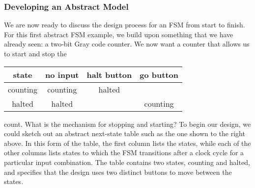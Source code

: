 \subsubsection{Developing an Abstract Model}

\begin{minipage}{3.25in}
We are now ready to discuss the design process for an FSM from start
to finish.
%
For this first abstract FSM example, we build upon something
that we have already seen: a two-bit Gray code counter.
We now want a counter that allows us to start and stop the\linebreak
\end{minipage}\hspace{.25in}%
\begin{minipage}{3in}
\begin{tabular}{c|ccc}
state&    no input&  halt button& go button\\ \hline
counting& counting&      halted& \\
halted&   halted&              & counting
\end{tabular}
\end{minipage}\mpdone

count.
%
What is the mechanism for stopping and starting?  To
begin our design, we could sketch out an abstract next-state
table such as the one shown to the right above.  In this form of the table,
the first column lists the states, while each of the other columns lists
states to which the FSM transitions after a clock cycle for a particular
input combination. 
%
The table contains two states, counting and halted, and specifies
that the design uses two distinct buttons to move between the
states.

